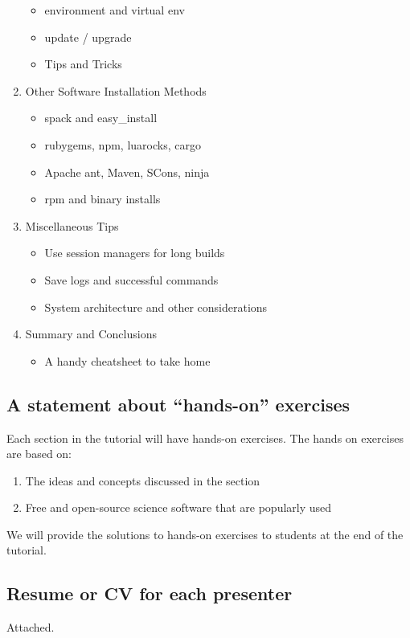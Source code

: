 \documentclass{report}
\begin{document}
\begin{enumerate}
\begin{itemize}
    \item environment and virtual env
    \item update / upgrade
    \item Tips and Tricks
  \end{itemize}
\item Other Software Installation Methods
    \begin{itemize}
        \item spack and easy\_install
        \item rubygems, npm, luarocks, cargo
        \item Apache ant, Maven, SCons, ninja 
        \item rpm and binary installs
    \end{itemize}
\item Miscellaneous Tips
  \begin{itemize}
    \item Use session managers for long builds
    \item Save logs and successful commands
    \item System architecture and other considerations
  \end{itemize}
\item Summary and Conclusions
  \begin{itemize}
    \item A handy cheatsheet to take home
  \end{itemize}
\end{enumerate}

\subsection*{A statement about ``hands-on'' exercises}
Each section in the tutorial will have hands-on exercises. The hands on exercises are based on:
\begin{enumerate}
\item The ideas and concepts discussed in the section 
\item Free and open-source science software that are popularly used
\end{enumerate}
We will provide the solutions to hands-on exercises to students at the end of the tutorial.

\subsection*{Resume or CV for each presenter}
Attached.
\end{document}
